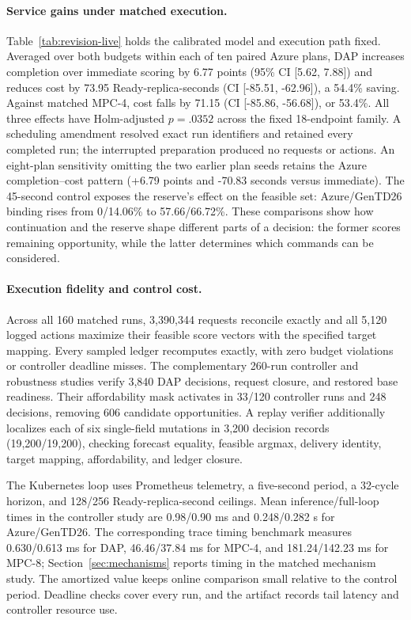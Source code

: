 \documentclass[acmsmall,screen,review,anonymous]{acmart}
\begin{document}


\paragraph{Service gains under matched execution.}
Table~\ref{tab:revision-live} holds the calibrated model and execution path
fixed. Averaged over both budgets within each of ten paired Azure plans, DAP
increases completion over immediate scoring by 6.77 points (95\% CI
[5.62, 7.88]) and reduces cost by 73.95 Ready-replica-seconds (CI
[-85.51, -62.96]), a 54.4\% saving. Against matched MPC-4, cost falls by
71.15 (CI [-85.86, -56.68]), or 53.4\%. All three effects have
Holm-adjusted $p=.0352$ across the fixed 18-endpoint family. A scheduling amendment resolved exact run identifiers and retained every
completed run; the interrupted preparation produced no requests or actions.
An eight-plan sensitivity omitting the two earlier plan seeds retains the
Azure completion--cost pattern (+6.79 points and -70.83 seconds versus immediate).
The 45-second control exposes the reserve's effect on the feasible set:
Azure/GenTD26 binding rises from 0/14.06\% to 57.66/66.72\%.
These comparisons show how continuation and the reserve shape different
parts of a decision: the former scores remaining opportunity, while the
latter determines which commands can be considered.

\paragraph{Execution fidelity and control cost.}
Across all 160 matched runs, 3,390,344 requests reconcile exactly and all 5,120
logged actions maximize their feasible score vectors with the specified target
mapping. Every sampled ledger recomputes exactly, with zero budget violations
or controller deadline misses. The complementary 260-run controller and
robustness studies verify 3,840 DAP decisions, request closure, and restored
base readiness. Their affordability mask activates in 33/120 controller runs
and 248 decisions, removing 606 candidate opportunities. A replay verifier
additionally localizes each of six single-field mutations in 3,200 decision
records (19,200/19,200), checking forecast equality, feasible argmax, delivery
identity, target mapping, affordability, and ledger closure.

The Kubernetes loop uses Prometheus telemetry, a five-second period, a
32-cycle horizon, and 128/256 Ready-replica-second ceilings. Mean
inference/full-loop times in the controller study are 0.98/0.90 ms and
0.248/0.282 s for Azure/GenTD26. The corresponding trace timing benchmark
measures 0.630/0.613 ms for DAP, 46.46/37.84 ms for MPC-4, and
181.24/142.23 ms for MPC-8; Section~\ref{sec:mechanisms} reports timing in
the matched mechanism study. The amortized value keeps online comparison
small relative to the control period. Deadline checks cover every run, and
the artifact records tail latency and controller resource use.
\end{document}
